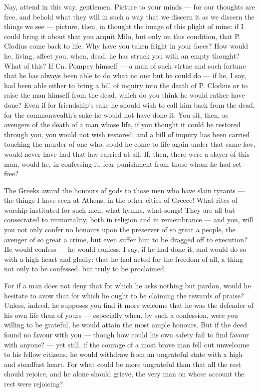  Nay, attend in this way, gentlemen. Picture to your minds --- for our thoughts are free, and behold what they will in such a way that we discern it as we discern the things we see --- picture, then, in thought the image of this plight of mine: if I could bring it about that you acquit Milo, but only on this condition, that P. Clodius come back to life. Why have you taken fright in your faces? How would he, living, affect you, when, dead, he has struck you with an empty thought? What of this? If Cn. Pompey himself --- a man of such virtue and such fortune that he has always been able to do what no one but he could do --- if he, I say, had been able either to bring a bill of inquiry into the death of P. Clodius or to raise the man himself from the dead, which do you think he would rather have done? Even if for friendship's sake he should wish to call him back from the dead, for the commonwealth's sake he would not have done it. You sit, then, as avengers of the death of a man whose life, if you thought it could be restored through you, you would not wish restored; and a bill of inquiry has been carried touching the murder of one who, could he come to life again under that same law, would never have had that law carried at all. If, then, there were a slayer of this man, would he, in confessing it, fear punishment from those whom he had set free?

 The Greeks award the honours of gods to those men who have slain tyrants --- the things I have seen at Athens, in the other cities of Greece! What rites of worship instituted for such men, what hymns, what songs! They are all but consecrated to immortality, both in religion and in remembrance --- and you, will you not only confer no honours upon the preserver of so great a people, the avenger of so great a crime, but even suffer him to be dragged off to execution? He would confess --- he would confess, I say, if he had done it, and would do so with a high heart and gladly: that he had acted for the freedom of all, a thing not only to be confessed, but truly to be proclaimed.

 For if a man does not deny that for which he asks nothing but pardon, would he hesitate to avow that for which he ought to be claiming the rewards of praise? Unless, indeed, he supposes you find it more welcome that he was the defender of his own life than of yours --- especially when, by such a confession, were you willing to be grateful, he would attain the most ample honours. But if the deed found no favour with you --- though how could his own safety fail to find favour with anyone? --- yet still, if the courage of a most brave man fell out unwelcome to his fellow citizens, he would withdraw from an ungrateful state with a high and steadfast heart. For what could be more ungrateful than that all the rest should rejoice, and he alone should grieve, the very man on whose account the rest were rejoicing?

